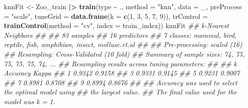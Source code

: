 \documentclass[
  notitlepage]{book}
\newenvironment{Shaded}{\begin{snugshade}}{\end{snugshade}}
\newcommand{\CommentTok}[1]{\textcolor[rgb]{0.56,0.35,0.01}{\textit{#1}}}
\newcommand{\DataTypeTok}[1]{\textcolor[rgb]{0.13,0.29,0.53}{#1}}
\newcommand{\DecValTok}[1]{\textcolor[rgb]{0.00,0.00,0.81}{#1}}
\newcommand{\ErrorTok}[1]{\textcolor[rgb]{0.64,0.00,0.00}{\textbf{#1}}}
\newcommand{\KeywordTok}[1]{\textcolor[rgb]{0.13,0.29,0.53}{\textbf{#1}}}
\newcommand{\NormalTok}[1]{#1}
\newcommand{\OperatorTok}[1]{\textcolor[rgb]{0.81,0.36,0.00}{\textbf{#1}}}
\newcommand{\StringTok}[1]{\textcolor[rgb]{0.31,0.60,0.02}{#1}}
\begin{document}
\begin{Shaded}
\begin{Highlighting}[]
\NormalTok{knnFit \textless{}{-}}\StringTok{ }\NormalTok{Zoo\_train }\OperatorTok{|}\ErrorTok{\textgreater{}}\StringTok{ }\KeywordTok{train}\NormalTok{(type }\OperatorTok{\textasciitilde{}}\StringTok{ }\NormalTok{.,}
  \DataTypeTok{method =} \StringTok{"knn"}\NormalTok{,}
  \DataTypeTok{data =}\NormalTok{ \_,}
  \DataTypeTok{preProcess =} \StringTok{"scale"}\NormalTok{,}
  \DataTypeTok{tuneGrid =} \KeywordTok{data.frame}\NormalTok{(}\DataTypeTok{k =} \KeywordTok{c}\NormalTok{(}\DecValTok{1}\NormalTok{, }\DecValTok{3}\NormalTok{, }\DecValTok{5}\NormalTok{, }\DecValTok{7}\NormalTok{, }\DecValTok{9}\NormalTok{)),}
    \DataTypeTok{trControl =} \KeywordTok{trainControl}\NormalTok{(}\DataTypeTok{method =} \StringTok{"cv"}\NormalTok{, }
                             \DataTypeTok{index =}\NormalTok{ train\_index))}
\NormalTok{knnFit}
\CommentTok{\#\# k{-}Nearest Neighbors }
\CommentTok{\#\# }
\CommentTok{\#\# 83 samples}
\CommentTok{\#\# 16 predictors}
\CommentTok{\#\#  7 classes: \textquotesingle{}mammal\textquotesingle{}, \textquotesingle{}bird\textquotesingle{}, \textquotesingle{}reptile\textquotesingle{}, \textquotesingle{}fish\textquotesingle{}, \textquotesingle{}amphibian\textquotesingle{}, \textquotesingle{}insect\textquotesingle{}, \textquotesingle{}mollusc.et.al\textquotesingle{} }
\CommentTok{\#\# }
\CommentTok{\#\# Pre{-}processing: scaled (16) }
\CommentTok{\#\# Resampling: Cross{-}Validated (10 fold) }
\CommentTok{\#\# Summary of sample sizes: 74, 75, 75, 75, 75, 74, ... }
\CommentTok{\#\# Resampling results across tuning parameters:}
\CommentTok{\#\# }
\CommentTok{\#\#   k  Accuracy  Kappa }
\CommentTok{\#\#   1  0.9342    0.9158}
\CommentTok{\#\#   3  0.9331    0.9145}
\CommentTok{\#\#   5  0.9231    0.9007}
\CommentTok{\#\#   7  0.8981    0.8708}
\CommentTok{\#\#   9  0.8994    0.8676}
\CommentTok{\#\# }
\CommentTok{\#\# Accuracy was used to select the optimal model using}
\CommentTok{\#\#  the largest value.}
\CommentTok{\#\# The final value used for the model was k = 1.}
\end{Highlighting}
\end{Shaded}

\begin{Shaded}
\end{Shaded}
\end{document}
